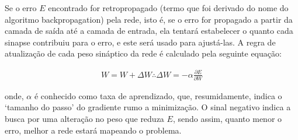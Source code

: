 Se o erro \(E\) encontrado for retropropagado (termo que foi derivado do nome do algoritmo backpropagation) pela rede, isto é, se o erro for propagado a partir da camada de saída até a camada de entrada, ela tentará estabelecer o quanto cada sinapse contribuiu para o erro, e este será usado para ajustá-las. A regra de atualização de cada peso sináptico da rede é calculado pela seguinte equação:

\begin{equation} \label{eqRNA4}
\begin{split}
W = W + \Delta W \therefore \Delta W = - \alpha\frac{\partial E}{\partial W}
\end{split}
\end{equation}

onde, \(\alpha\) é conhecido como taxa de aprendizado, que, resumidamente, indica o ‘tamanho do passo’ do gradiente rumo a minimização. O sinal negativo indica a busca por uma alteração no peso que reduza \(E\), sendo assim, quanto menor o erro, melhor a rede estará mapeando o problema.